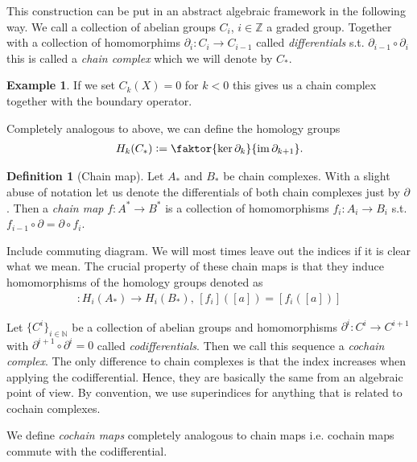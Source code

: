 \documentclass[12pt,a4paper]{article}
\numberwithin{equation}{subsection}
\numberwithin{lemma}{subsection}
\theoremstyle{definition}
\newtheorem{definition}[lemma]{Definition}
\newtheorem{example}[lemma]{Example}
\DeclareMathOperator{\Ima}{im}
\newcommand{\integers}{\mathbb{Z}}
\newcommand{\naturalnum}{\mathbb{N}}
\begin{document}
This construction can be put in an abstract algebraic framework in the following 
way. We call a collection of abelian groups $C_i$, $i\in \integers$ a graded group.                                                   
Together with a collection of homomorphims $\partial_i: C_i \rightarrow C_{i-1}$ 
called \textit{differentials}
s.t. $\partial_{i-1} \circ \partial_i$ this is called a \textit{chain complex} which 
we will denote by $C_*$. 

\begin{example}
    If we set $C_k(X) = {0}$ for $k < 0$ this gives us a chain complex together with 
    the boundary operator. 
\end{example}

Completely analogous to above, we can define the homology groups 
\begin{align*}
    H_k(C_*) \vcentcolon= \faktor{\ker \partial_k}{\Ima \partial_{k+1}}.
\end{align*}

\begin{definition}[Chain map]
    Let $A_*$ and $B_*$ be chain complexes. With a slight abuse of notation
    let us denote the differentials of 
    both chain complexes just by $\partial$.
    Then a \textit{chain map} $f: A^* \rightarrow B^*$ is a collection 
    of homomorphisms $f_i: A_i \rightarrow B_i$ s.t. 
    $f_{i-1} \circ \partial = \partial \circ f_i$.
\end{definition}
{\color{red} Include commuting diagram.} We will most times leave out the 
indices if it is clear what we mean.
The crucial property of these chain maps is that they induce homomorphisms of
the homology groups denoted as
\begin{align*}
    [f_i]: H_i(A_*) \rightarrow H_i(B_*), \, [f_i]([a]) = [f_i([a])]
\end{align*}


Let $\{ C^i \}_{i\in \naturalnum}$ be a collection of abelian groups
and homomorphisms $\partial^i: C^i \rightarrow C^{i+1}$ with 
$\partial^{i+1} \circ \partial^i = 0$ called \textit{codifferentials}. 
Then we call this sequence a 
\textit{cochain complex}. The only difference to chain complexes
is that the index 
increases when applying the codifferential. Hence, they are 
basically the same from an algebraic point of view.
By convention, 
we use superindices for anything that is related to cochain complexes.

We define \textit{cochain maps} completely analogous to chain maps 
i.e. cochain maps commute with the codifferential.
\end{document}
